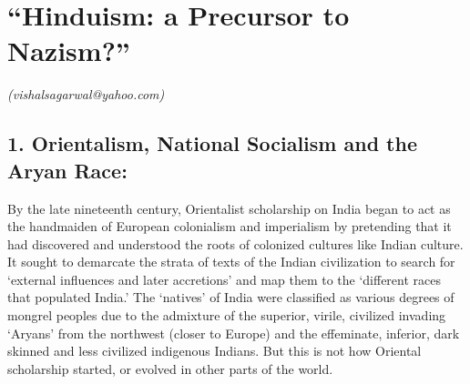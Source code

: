 
\chapter{“Hinduism: a Precursor to Nazism?”}\label{chapter8}


\begin{flushright}
\textit{(vishalsagarwal@yahoo.com)}
\end{flushright}

\setcounter{endnote}{0}

\section*{1. Orientalism, National Socialism and the Aryan Race:}

By the late nineteenth century, Orientalist scholarship on India began to act as the handmaiden of European colonialism and imperialism by pretending that it had discovered and understood the roots of colonized cultures like Indian culture. It sought to demarcate the strata of texts of the Indian civilization to search for ‘external influences and later accretions’ and map them to the ‘different races that populated India.’ The ‘natives’ of India were classified as various degrees of mongrel peoples due to the admixture of the superior, virile, civilized invading ‘Aryans’ from the northwest (closer to Europe) and the effeminate, inferior, dark skinned and less civilized indigenous Indians. But this is not how Oriental scholarship started, or evolved in other parts of the world.


